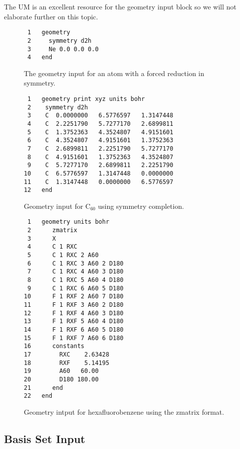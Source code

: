 \documentclass[letterpaper,12pt]{article}
\begin{document}
The UM is an excellent resource for the geometry input block so we will not elaborate further on this topic.

\begin{figure}
    \caption{The geometry input for an atom with a forced reduction in symmetry.}
    \label{fig:NeonGeometry}
    \begin{verbatim}
 1   geometry
 2     symmetry d2h
 3     Ne 0.0 0.0 0.0
 4   end
    \end{verbatim}
\end{figure}

\begin{figure}
    \caption{Geometry input for C$_{60}$ using symmetry completion.}
    \label{fig:C60geometry}
    \begin{verbatim}
 1   geometry print xyz units bohr
 2    symmetry d2h
 3    C  0.0000000   6.5776597   1.3147448
 4    C  2.2251790   5.7277170   2.6899811
 5    C  1.3752363   4.3524807   4.9151601
 6    C  4.3524807   4.9151601   1.3752363
 7    C  2.6899811   2.2251790   5.7277170
 8    C  4.9151601   1.3752363   4.3524807
 9    C  5.7277170   2.6899811   2.2251790
10    C  6.5776597   1.3147448   0.0000000
11    C  1.3147448   0.0000000   6.5776597
12   end
    \end{verbatim}
\end{figure}

\begin{figure}
    \caption{Geometry intput for hexafluorobenzene using the zmatrix format.}
    \label{fig:HexafluorobenzeneZMatrix}
    \begin{verbatim}
 1   geometry units bohr
 2      zmatrix
 3      X
 4      C 1 RXC
 5      C 1 RXC 2 A60
 6      C 1 RXC 3 A60 2 D180
 7      C 1 RXC 4 A60 3 D180
 8      C 1 RXC 5 A60 4 D180
 9      C 1 RXC 6 A60 5 D180
10      F 1 RXF 2 A60 7 D180
11      F 1 RXF 3 A60 2 D180
12      F 1 RXF 4 A60 3 D180
13      F 1 RXF 5 A60 4 D180
14      F 1 RXF 6 A60 5 D180
15      F 1 RXF 7 A60 6 D180
16      constants
17        RXC    2.63428
18        RXF    5.14195
19        A60   60.00
20        D180 180.00
21      end
22   end
    \end{verbatim}
\end{figure}

\newpage

\subsection{Basis Set Input}\label{sec:BasisSetInput}
\end{document}
